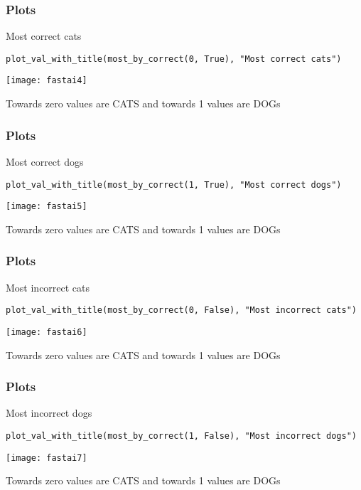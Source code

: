 \begin{frame}[fragile] \frametitle{Plots}
Most correct cats
\begin{lstlisting}
plot_val_with_title(most_by_correct(0, True), "Most correct cats")
\end{lstlisting}
\begin{center}
\texttt{[image: fastai4]}
\end{center}
Towards zero values are CATS and towards 1 values are DOGs
\end{frame}

\begin{frame}[fragile] \frametitle{Plots}
Most correct dogs
\begin{lstlisting}
plot_val_with_title(most_by_correct(1, True), "Most correct dogs")
\end{lstlisting}
\begin{center}
\texttt{[image: fastai5]}
\end{center}
Towards zero values are CATS and towards 1 values are DOGs
\end{frame}

\begin{frame}[fragile] \frametitle{Plots}
Most incorrect cats
\begin{lstlisting}
plot_val_with_title(most_by_correct(0, False), "Most incorrect cats")
\end{lstlisting}
\begin{center}
\texttt{[image: fastai6]}
\end{center}
Towards zero values are CATS and towards 1 values are DOGs
\end{frame}

\begin{frame}[fragile] \frametitle{Plots}
Most incorrect dogs
\begin{lstlisting}
plot_val_with_title(most_by_correct(1, False), "Most incorrect dogs")
\end{lstlisting}
\begin{center}
\texttt{[image: fastai7]}
\end{center}
Towards zero values are CATS and towards 1 values are DOGs
\end{frame}

